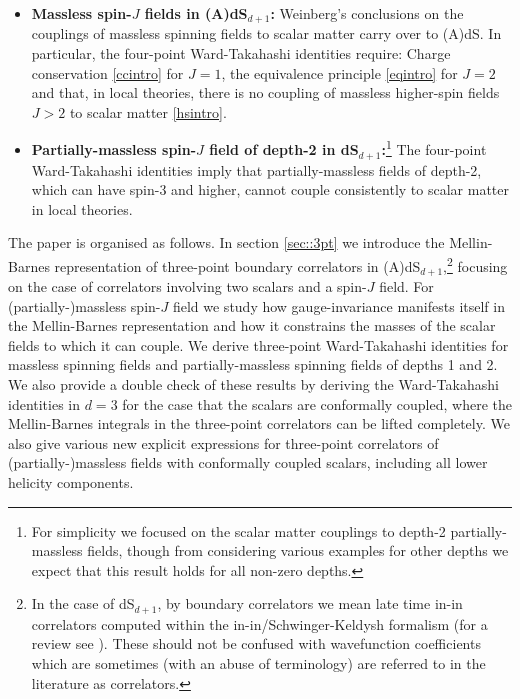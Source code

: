 \documentclass[11pt,a4paper]{article}
\begin{document}
\begin{itemize}
    \item {\bf Massless spin-$J$ fields in (A)dS$_{d+1}$:} Weinberg's conclusions on the couplings of massless spinning fields to scalar matter carry over to (A)dS. In particular, the four-point Ward-Takahashi identities require: Charge conservation \eqref{ccintro} for $J=1$, the equivalence principle \eqref{eqintro} for $J=2$ and that, in local theories, there is no coupling of massless higher-spin fields $J>2$ to scalar matter \eqref{hsintro}.
    \item {\bf Partially-massless spin-$J$ field of depth-2 in dS$_{d+1}$:}\footnote{For simplicity we focused on the scalar matter couplings to depth-2 partially-massless fields, though from considering various examples for other depths we expect that this result holds for all non-zero depths.} The four-point Ward-Takahashi identities imply that partially-massless fields of depth-2, which can have spin-3 and higher, cannot couple consistently to scalar matter in local theories. 
\end{itemize}

The paper is organised as follows. In section \ref{sec::3pt} we introduce the Mellin-Barnes representation of three-point boundary correlators in (A)dS$_{d+1}$,\footnote{In the case of dS$_{d+1}$, by boundary correlators we mean late time in-in correlators computed within the in-in/Schwinger-Keldysh formalism \cite{Maldacena:2002vr,Weinberg:2005vy} (for a review see \cite{Chen:2017ryl}). These should not be confused with wavefunction coefficients which are sometimes (with an abuse of terminology) are referred to in the literature as correlators.} focusing on the case of correlators involving two scalars and a spin-$J$ field. For (partially-)massless spin-$J$ field we study how gauge-invariance manifests itself in the Mellin-Barnes representation and how it constrains the masses of the scalar fields to which it can couple. We derive three-point Ward-Takahashi identities for massless spinning fields and partially-massless spinning fields of depths 1 and 2. We also provide a double check of these results by deriving the Ward-Takahashi identities in $d=3$ for the case that the scalars are conformally coupled, where the Mellin-Barnes integrals in the three-point correlators can be lifted completely. We also give various new explicit expressions for three-point correlators of (partially-)massless fields with conformally coupled scalars, including all lower helicity components.
\end{document}
